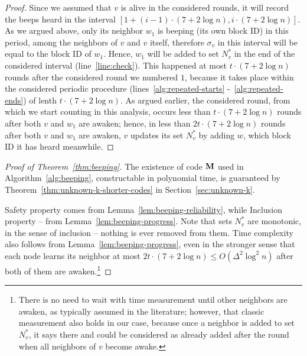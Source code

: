 \documentclass[11pt]{article}
\begin{document}
\begin{proof}
Since we assumed that $v$ is alive in the considered rounds, it will record the beeps heard in the interval $[1+(i-1)\cdot (7+2\log n),i\cdot (7+2\log n)]$. As we argued above, only its neighbor $w_1$ is beeping (its own block ID) in this period, among the neighbors of $v$ and $v$ itself, therefore $\sigma_v$ in this interval will be equal to the block ID of $w_1$. Hence, $w_1$ will be added to set $N^*_v$ in the end of the considered interval (line~\ref{line:check}). This happened at most $t\cdot (7+2\log n)$ rounds after the considered round we numbered $1$, because it takes place within the considered periodic procedure (lines~\ref{alg:repeated-starts} -~\ref{alg:repeated-ends}) of lenth $t\cdot (7+2\log n)$. 
As argued earlier, the considered round, from which we start counting in this analysis, occurs less than $t\cdot (7+2\log n)$ rounds after both $v$ and $w_1$ are awaken; hence, in less than $2t\cdot (7+2\log n)$ rounds after both $v$ and $w_1$ are awaken, $v$ updates its set $N^*_v$ by adding $w$, which block ID it has heard meanwhile.  
\end{proof}



\begin{proof}[Proof of Theorem~\ref{thm:beeping}]
The existence of code ${\mathbf M}$ used in Algorithm~\ref{alg:beeping}, constructable in polynomial time, is guaranteed by Theorem~\ref{thm:unknown-k-shorter-codes} in Section~\ref{sec:unknown-k}.

Safety property comes from Lemma~\ref{lem:beeping-reliability}, while Inclusion property -- from Lemma~\ref{lem:beeping-progress}.
Note that sets $N^*_v$ are monotonic, in the sense of inclusion -- nothing is ever removed from them. 
Time complexity also follows from Lemma~\ref{lem:beeping-progress}, even in the stronger sense that each node learns its neighbor at most $2t\cdot (7+2\log n) \le O(\Delta^2\log^2 n)$ after both of them are awaken.\footnote{There is no need to wait with time measurement until other neighbors are awaken, as typically assumed in the literature; however, that classic measurement also holds in our case, because once a neighbor is added to set $N^*_v$, it says there and could be considered as already added after the round when all neighbors of $v$ become awake.}
\end{proof}
\end{document}
